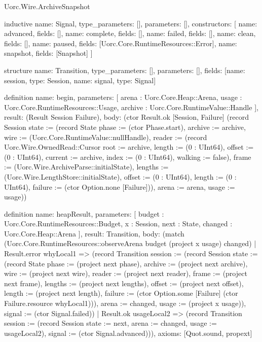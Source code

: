 \begin{lexlean}{Uorc.Wire.ArchiveSnapshot}
\begin{semanticmodule}
inductive{
  name: Signal,
  type_parameters: [],
  parameters: [],
  constructors: [
    {name: advanced, fields: []},
    {name: complete, fields: []},
    {name: failed, fields: []},
    {name: clean, fields: []},
    {name: paused, fields: [Uorc.Core.RuntimeResources::Error]},
    {name: snapshot, fields: [Snapshot]}
  ]
}

structure{
  name: Transition,
  type_parameters: [],
  parameters: [],
  fields: [{name: session, type: Session}, {name: signal, type: Signal}]
}

definition{
  name: begin,
  parameters: [
    arena : Uorc.Core.Heap::Arena,
    usage : Uorc.Core.RuntimeResources::Usage,
    archive : Uorc.Core.RuntimeValue::Handle
  ],
  result: (Result Session Failure),
  body: (ctor Result.ok [Session, Failure] (record Session {state := (record State {phase := (ctor Phase.start), archive := archive, wire := (Uorc.Core.RuntimeValue::nullHandle), reader := (record Uorc.Wire.OwnedRead::Cursor {root := archive, length := (0 : UInt64), offset := (0 : UInt64), current := archive, index := (0 : UInt64), walking := false}), frame := (Uorc.Wire.ArchiveParse::initialState), lengths := (Uorc.Wire.LengthStore::initialState), offset := (0 : UInt64), length := (0 : UInt64), failure := (ctor Option.none [Failure])}), arena := arena, usage := usage}))
}

definition{
  name: heapResult,
  parameters: [
    budget : Uorc.Core.RuntimeResources::Budget,
    x : Session,
    next : State,
    changed : Uorc.Core.Heap::Arena
  ],
  result: Transition,
  body: (match (Uorc.Core.RuntimeResources::observeArena budget (project x usage) changed)
    | Result.error whyLocal1 => (record Transition {session := (record Session {state := (record State {phase := (project next phase), archive := (project next archive), wire := (project next wire), reader := (project next reader), frame := (project next frame), lengths := (project next lengths), offset := (project next offset), length := (project next length), failure := (ctor Option.some [Failure] (ctor Failure.resource whyLocal1))}), arena := changed, usage := (project x usage)}), signal := (ctor Signal.failed)})
    | Result.ok usageLocal2 => (record Transition {session := (record Session {state := next, arena := changed, usage := usageLocal2}), signal := (ctor Signal.advanced)})),
  axioms: [Quot.sound, propext]
}


\end{semanticmodule}
\end{lexlean}
